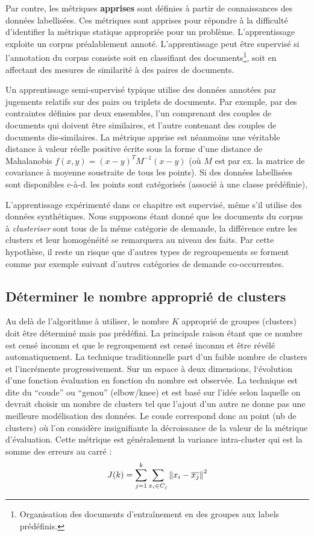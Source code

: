Par contre, les métriques \textbf{apprises} sont définies à partir de connaissances des données labellisées. Ces métriques sont apprises pour répondre à la difficulté d'identifier la métrique statique appropriée pour un problème. L'apprentissage exploite un corpus préalablement annoté. L'apprentissage peut être supervisé si l'annotation du corpus consiste soit en classifiant des documents\footnote{Organisation des documents d'entraînement en des groupes aux labels prédéfinis.}, soit en affectant des mesures de similarité à des paires de documents. 

 Un apprentissage semi-supervisé typique utilise des données annotées par jugements relatifs sur des pairs ou triplets de documents. Par exemple, par des contraintes définies par deux ensembles, l'un comprenant des couples de documents qui doivent être similaires, et l'autre contenant des couples de documents dis-similaires. La métrique apprise est néanmoins une véritable distance à valeur réelle positive écrite sous la forme d'une distance de Mahalanobis $f(x,y) = (x-y)^T M^{-1}(x-y)$ (où $M$ est par ex. la matrice de covariance à moyenne soustraite de tous les points). Si des données labellisées sont disponibles c-à-d. les points sont catégorisés (associé à une classe prédéfinie), 
 
 L'apprentissage expérimenté dans ce chapitre est supervisé, même s'il utilise des données synthétiques. Nous supposons étant donné que les documents du corpus à \textit{clusteriser} sont tous de la même catégorie de demande, la différence entre les clusters et leur homogénéité se remarquera au niveau des faits. Par cette hypothèse, il reste un risque que d'autres types de regroupements se forment comme par exemple suivant d'autres catégories de demande co-occurrentes.


\subsection{Déterminer le nombre approprié de clusters} Au delà de l’algorithme à utiliser, le nombre $K$ approprié de groupes (clusters) doit être déterminé mais pas prédéfini. La principale raison étant que ce nombre est censé inconnu et que le regroupement est censé inconnu et être révélé automatiquement.
La technique traditionnelle part d’un faible nombre de clusters et l’incrémente progressivement. Sur un espace à deux dimensions,  l‘évolution d’une fonction évaluation en fonction du nombre est observée.  La technique est dite du “coude” ou “genou” (elbow/knee) et est basé sur l’idée selon laquelle on devrait choisir un nombre de clusters tel que l’ajout d’un autre ne donne pas une meilleure modélisation des données. Le coude correspond donc au point (nb de clusters) où l’on considère insignifiante la décroissance de la valeur de la métrique d’évaluation. Cette métrique est généralement la variance intra-cluster qui est la somme des erreurs au carré  :
\[J(k) = \sum\limits_{j=1}^k\sum\limits_{x_i \in C_j}\left\lVert x_i-\overline{x_j}\right\rVert^2\]

